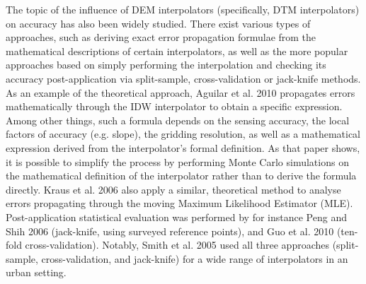 The topic of the influence of DEM interpolators (specifically, DTM interpolators) on accuracy has also been widely studied. There exist various types of approaches, such as deriving exact error propagation formulae from the mathematical descriptions of certain interpolators, as well as the more popular approaches based on simply performing the interpolation and checking its accuracy post-application via split-sample, cross-validation or jack-knife methods. As an example of the theoretical approach, Aguilar et al. 2010 propagates errors mathematically through the IDW interpolator to obtain a specific expression. Among other things, such a formula depends on the sensing accuracy, the local factors of accuracy (e.g. slope), the gridding resolution, as well as a mathematical expression derived from the interpolator’s formal definition. As that paper shows, it is possible to simplify the process by performing Monte Carlo simulations on the mathematical definition of the interpolator rather than to derive the formula directly. Kraus et al. 2006 also apply a similar, theoretical method to analyse errors propagating through the moving Maximum Likelihood Estimator (MLE). Post-application statistical evaluation was performed by for instance Peng and Shih 2006 (jack-knife, using surveyed reference points), and Guo et al. 2010 (ten-fold cross-validation). Notably, Smith et al. 2005 used all three approaches (split-sample, cross-validation, and jack-knife) for a wide range of interpolators in an urban setting.

